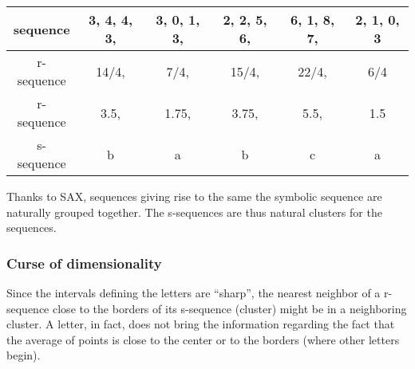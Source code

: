 \documentclass[a4paper,twoside]{article}
\begin{document}
 \begin{strip}

\begin{center}
\begin{tabular}{|c||c|c|c|c|c|}
\hline
sequence  &  3, 4, 4, 3,   &  3, 0, 1, 3,  & 2, 2, 5, 6,  &  6, 1, 8, 7, & 2, 1, 0, 3  \\
\hline
r-sequence &     14/4,     &      7/4,      &       15/4,    &     22/4,     & 6/4   \\
r-sequence &       3.5,    &         1.75,    &       3.75, &      5.5,   &  1.5  \\
\hline
s-sequence &            b       &          a        &             b     &        c        &    a     \\       
\hline 
\end{tabular}
\end{center}
\end{strip}

 
 
 
 
Thanks to SAX, sequences giving rise to the same the symbolic sequence are naturally grouped together. The s-sequences are thus natural clusters for the sequences.   
%


% 

%


\subsubsection{Curse of dimensionality}\label{sssec:curse}
Since the intervals defining the letters are ``sharp'', the nearest neighbor of a r-sequence close to the borders of its s-sequence (cluster) might be in a neighboring cluster.
%
%
A letter, in fact, does not bring the information regarding the fact that the average of points is close to the center or to the borders (where other letters begin).  
%
%
\end{document}
